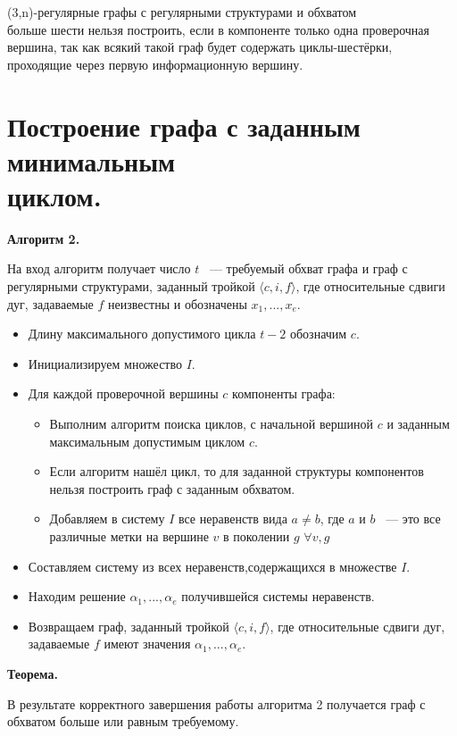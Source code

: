 \documentclass[14pt]{mmcs-article}
\begin{document}
(3,n)-регулярные графы с регулярными структурами и обхватом\\ больше шести нельзя построить, если в компоненте только одна проверочная вершина, так как всякий такой граф будет содержать циклы-шестёрки, проходящие через первую информационную вершину.


\section{Построение графа с заданным минимальным\\ циклом.}

\textbf{Алгоритм 2.}

На вход алгоритм получает число $t$ ~--- требуемый обхват графа и граф с регулярными структурами, заданный тройкой $\langle c, i, f \rangle$, где относительные сдвиги дуг, задаваемые $f$ неизвестны и обозначены $x_1, ..., x_e$.  

\begin{itemize}
\item Длину максимального допустимого цикла $t - 2$ обозначим $c$.
\item Инициализируем множество $I$.
\item Для каждой проверочной вершины $c$ компоненты графа:
\begin{itemize}
  \item Выполним алгоритм поиска циклов, с начальной вершиной $c$ и заданным максимальным допустимым циклом $c$.
  \item Если алгоритм нашёл цикл, то для заданной структуры компонентов нельзя построить граф с заданным обхватом.
  \item Добавляем в систему $I$ все неравенств вида $a \neq b$, где $a$ и $b$ ~--- это все различные метки на вершине $v$ в поколении $g$ $\forall v, g$
\end{itemize}
\item Составляем систему из всех неравенств,содержащихся в множестве $I$.
\item Находим решение $\alpha_1, ..., \alpha_e$ получившейся системы неравенств.
\item Возвращаем граф, заданный тройкой $\langle c, i, f \rangle$, где относительные сдвиги дуг, задаваемые $f$ имеют значения $\alpha_1, ..., \alpha_e$.
\end{itemize}

\textbf{Теорема.}

В результате корректного завершения работы алгоритма 2 получается граф с обхватом больше или равным требуемому.
\end{document}
